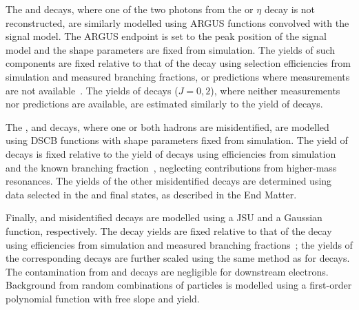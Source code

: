 The \mbox{\decay{\BdorBsorbar}{\kpi\piz}} and \mbox{\decay{\BdorBsorbar}{\kpi\eta}} decays, where one of the two photons from the \piz or $\eta$ decay is not reconstructed, are similarly modelled using ARGUS functions convolved with the signal model.
The ARGUS endpoint is set to the peak position of the signal model and the shape parameters are fixed from simulation.
The yields of such components are fixed relative to that of the \bdkpig decay using selection efficiencies from simulation and measured branching fractions, or predictions where measurements are not available~\cite{BaBar:2011vfx,Zhou:2023lbc,Wang:2020saq,PDG2024}.
The yields of \mbox{} decays \mbox{($J=0,2$)}, where neither measurements nor predictions are available, are estimated similarly to the yield of \mbox{\decay{\Bs}{\Km\pip\pi(\pi)\gamma}} decays.

The \bskkg, \lbpkg and \mbox{\decay{\Bd}{\pip\pim\gamma}} decays, where one or both hadrons are misidentified, are modelled using DSCB functions with shape parameters fixed from simulation.
The yield of \mbox{\decay{\Bd}{\pip\pim\gamma}} decays is fixed relative to the yield of \bdkpig decays using efficiencies from simulation and the known \mbox{} branching fraction~\cite{LHCb-PAPER-2025-017}, neglecting contributions from higher-mass resonances.
The yields of the other misidentified decays are determined using data selected in the \kkg and \pkg final states, as described in the End Matter.



Finally, \mbox{\decay{\BdorBsorbar}{\Kstarzbv\ep\en}} and misidentified \mbox{\decay{\BdorBsorbar}{\Kstarzbv\pip\pim}} decays are modelled using a JSU and a Gaussian function, respectively.
The \Bzb decay yields are fixed relative to that of the \bdkpig decay using efficiencies from simulation and measured branching fractions~\cite{Belle:2009zue,BaBar:2008jdv,BaBar:2007nlh,PDG2024}; the yields of the corresponding \Bs decays are further scaled using the same method as for \mbox{\decay{\Bs}{\Km\pip\pi(\pi)\gamma}} decays.
The contamination from \mbox{\decay{\BdorBsorbar}{\Kstarzbv\ep\en}} and \mbox{\decay{\BdorBsorbar}{\Kstarzbv\pip\pim}} decays are negligible for downstream electrons.
Background from random combinations of particles is modelled using a first-order polynomial function with free slope and yield.

